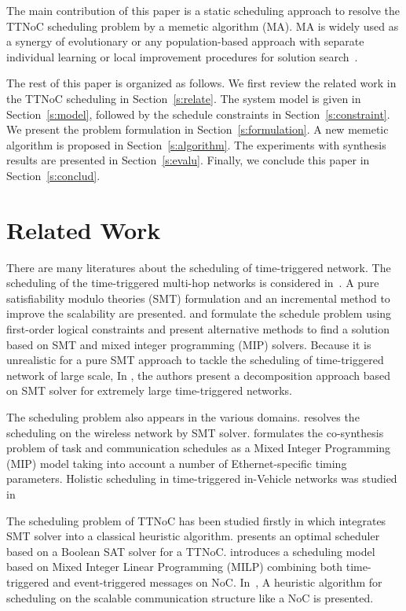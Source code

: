 \documentclass[journal]{IEEEtran}
\theoremstyle{remark}
\begin{document}
The main contribution of this paper is a static scheduling approach to resolve the TTNoC scheduling problem by a memetic algorithm (MA). 
MA is widely used as a synergy of evolutionary or any population-based approach with separate individual learning or local improvement procedures for solution search~\cite{DBLP:journals/tec/ChenOLT11}. 

The rest of this paper is organized as follows. 
We first review the related work in the TTNoC scheduling in Section~\ref{s:relate}. 
The system model is given in Section~\ref{s:model},
 followed by the schedule constraints in Section~\ref{s:constraint}.
We present the problem formulation in Section~\ref{s:formulation}.
A new memetic algorithm is proposed in Section~\ref{s:algorithm}.
The experiments with synthesis results are presented in Section~\ref{s:evalu}.
Finally, we conclude this paper in Section~\ref{s:conclud}.

\section{Related Work	\label{s:relate}}

There are many literatures about the scheduling of time-triggered network.
The scheduling of the time-triggered multi-hop networks is considered in~\cite{DBLP:conf/rtss/Steiner10}.
A pure satisfiability modulo theories (SMT) formulation and an incremental method to improve the scalability are presented.
\cite{DBLP:journals/rts/CraciunasO16} and \cite{DBLP:conf/rtns/CraciunasO14} formulate the schedule problem using first-order logical constraints and present alternative methods to find a solution based on SMT and mixed integer programming (MIP) solvers.
Because it is unrealistic for a pure SMT approach to tackle the scheduling of time-triggered network of large scale,
 In \cite{DBLP:conf/etfa/PozoSRH15},
  the authors present a decomposition approach based on SMT solver for extremely large time-triggered networks.

The scheduling problem also appears in the various domains.
\cite{DBLP:conf/isorc/RoRM15} resolves the scheduling on the wireless network by SMT solver.
\cite{DBLP:conf/aspdac/ZhangG0C14} formulates the co-synthesis problem of task and communication schedules as a Mixed Integer Programming (MIP) model taking into account a number of Ethernet-specific timing parameters.
Holistic scheduling in time-triggered in-Vehicle networks was studied in~\cite{DBLP:journals/tii/HuLWLZ14}

The scheduling problem of TTNoC has been
studied firstly in \cite{DBLP:conf/date/HuangBRBK12} which integrates SMT solver into a classical heuristic algorithm. 
\cite{DBLP:conf/sies/ScholerKMO15} presents an optimal scheduler based on a Boolean SAT solver for a TTNoC.
\cite{DBLP:conf/indin/MurshedOAK15} introduces a scheduling model based on Mixed Integer Linear Programming (MILP) combining both time-triggered and event-triggered messages on NoC.
In~\cite{DBLP:conf/sies/FreierC15},
 A heuristic algorithm for scheduling on the scalable communication structure like a NoC is presented. 
\end{document}

